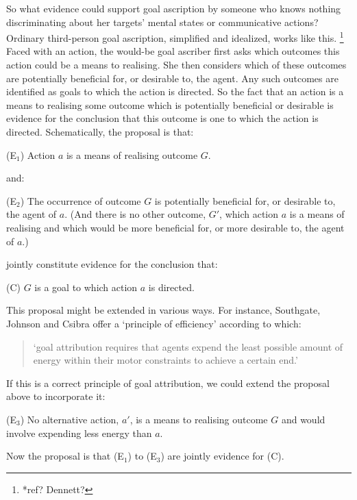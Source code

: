 \documentclass[12pt,a4paper]{extarticle}
\begin{document}
So what evidence could support goal ascription by someone who knows nothing discriminating about her targets' mental states or communicative actions?
Ordinary third-person goal ascription, simplified and idealized, works like this.%
\footnote{
*ref? Dennett?
}
Faced with an action,
the would-be goal ascriber first asks which outcomes this action could be a means to realising.
She then considers which of these outcomes are potentially beneficial for, or desirable to, the agent.
Any such outcomes are identified as goals to which the action is directed.
So the fact that an action is a means to realising some outcome which is potentially beneficial or desirable is evidence for the conclusion that this outcome is one to which the action is directed.
Schematically, the proposal is that:
%
\begin{idescription}
\item[(E$_1$)] Action $a$ is a means of realising outcome $G$.
\end{idescription}
%
and:
%
\begin{idescription}
\item[(E$_2$)] The occurrence of outcome $G$ is potentially beneficial for, or desirable to, the agent of $a$.
(And there is no other outcome, $G'$, which action $a$ is a means of realising and which would be more beneficial for, or more desirable to, the agent of $a$.)
\end{idescription}
%
jointly constitute evidence for the conclusion that:
%
\begin{idescription}
\item[(C)] $G$ is a goal to which action $a$ is directed.
\end{idescription}

This proposal might be extended in various ways.
For instance, Southgate, Johnson and Csibra offer a `principle of efficiency' according to which:
%
\begin{quote}
`goal attribution requires that agents expend the least possible amount of energy within their motor constraints to achieve a certain end.'
\citep[p.\ *]{Southgate:2008el}
\end{quote}
%
If this is a correct principle of goal attribution, we could extend the proposal above to incorporate it:
%
\begin{idescription}
\item[(E$_3$)] No alternative action, $a'$, is a means to realising outcome $G$ and would involve expending less energy than $a$.
\end{idescription}
%
Now the proposal is that (E$_1$) to (E$_3$) are jointly evidence for (C).
\end{document}
